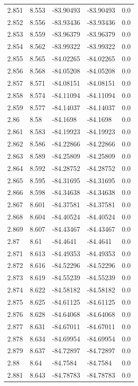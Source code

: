 \begin{tabular}{lllll}
2.851 & 8.553 & -83.90493 & -83.90493 & 0.0 \\
2.852 & 8.556 & -83.93436 & -83.93436 & 0.0 \\
2.853 & 8.559 & -83.96379 & -83.96379 & 0.0 \\
2.854 & 8.562 & -83.99322 & -83.99322 & 0.0 \\
2.855 & 8.565 & -84.02265 & -84.02265 & 0.0 \\
2.856 & 8.568 & -84.05208 & -84.05208 & 0.0 \\
2.857 & 8.571 & -84.08151 & -84.08151 & 0.0 \\
2.858 & 8.574 & -84.11094 & -84.11094 & 0.0 \\
2.859 & 8.577 & -84.14037 & -84.14037 & 0.0 \\
2.86 & 8.58 & -84.1698 & -84.1698 & 0.0 \\
2.861 & 8.583 & -84.19923 & -84.19923 & 0.0 \\
2.862 & 8.586 & -84.22866 & -84.22866 & 0.0 \\
2.863 & 8.589 & -84.25809 & -84.25809 & 0.0 \\
2.864 & 8.592 & -84.28752 & -84.28752 & 0.0 \\
2.865 & 8.595 & -84.31695 & -84.31695 & 0.0 \\
2.866 & 8.598 & -84.34638 & -84.34638 & 0.0 \\
2.867 & 8.601 & -84.37581 & -84.37581 & 0.0 \\
2.868 & 8.604 & -84.40524 & -84.40524 & 0.0 \\
2.869 & 8.607 & -84.43467 & -84.43467 & 0.0 \\
2.87 & 8.61 & -84.4641 & -84.4641 & 0.0 \\
2.871 & 8.613 & -84.49353 & -84.49353 & 0.0 \\
2.872 & 8.616 & -84.52296 & -84.52296 & 0.0 \\
2.873 & 8.619 & -84.55239 & -84.55239 & 0.0 \\
2.874 & 8.622 & -84.58182 & -84.58182 & 0.0 \\
2.875 & 8.625 & -84.61125 & -84.61125 & 0.0 \\
2.876 & 8.628 & -84.64068 & -84.64068 & 0.0 \\
2.877 & 8.631 & -84.67011 & -84.67011 & 0.0 \\
2.878 & 8.634 & -84.69954 & -84.69954 & 0.0 \\
2.879 & 8.637 & -84.72897 & -84.72897 & 0.0 \\
2.88 & 8.64 & -84.7584 & -84.7584 & 0.0 \\
2.881 & 8.643 & -84.78783 & -84.78783 & 0.0 \\

\end{tabular}
